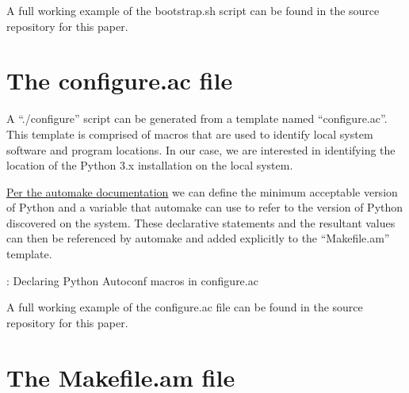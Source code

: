 \justifying
A full working example of the bootstrap.sh script can be found in the source repository for this paper.

\section{\label{sec:config}The configure.ac file}
\vspace{2mm}
\justifying
A ``./configure'' script can be generated from a template named ``configure.ac''. This template is comprised of macros that are used to identify local system
software and program locations. In our case, we are interested in identifying the location of the Python 3.x installation on the local system.

\justifying
\href{https://www.gnu.org/software/automake/manual/html\_node/Python.html}{Per the automake documentation} we can define the minimum acceptable version of Python
and a variable that automake can use to refer to the version of Python discovered on the system. These declarative statements and the resultant values can then be
referenced by automake and added explicitly to the ``Makefile.am'' template.

\begin{mybox}{\thetcbcounter: Declaring Python Autoconf macros in configure.ac}
    
\end{mybox}
\vspace{2mm}

\justifying
A full working example of the configure.ac file can be found in the source repository for this paper.

\section{\label{sec:make}The Makefile.am file}



